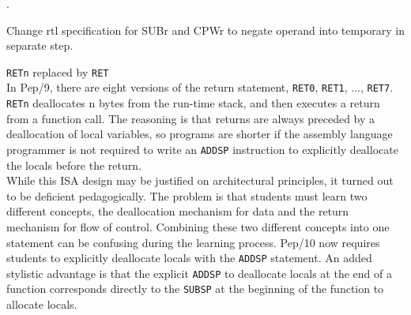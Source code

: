 \documentclass[10pt,fleqn]{book}
\newenvironment{exercises}
   {\begin{list}
      {\arabic{ecounter}.}
      {
         \usecounter{ecounter}
         \setcounter {ecounter}{0}
         \setlength\leftmargin{2pc}
         \setlength\labelwidth{6pc}
         \setlength\labelsep{1pc}
      }}
   {\end{list}}
\newcounter{ecounter}
\begin{document}
\begin{exercises}
\item Change rtl specification for SUBr and CPWr to negate operand into temporary in separate step.\\[6pt]
\item \verb|RETn| replaced by \verb|RET|\\[6pt]
In Pep/9, there are eight versions of the return statement, \verb|RET0|, \verb|RET1|, ..., \verb|RET7|.
\verb|RETn| deallocates n bytes from the run-time stack, and then executes a return from a function call.
The reasoning is that returns are always preceded by a deallocation of local variables, so programs are shorter if the assembly language programmer is not required to write an \verb|ADDSP| instruction to explicitly deallocate the locals before the return.\\[6pt]
While this ISA design may be justified on architectural principles, it turned out to be deficient pedagogically.
The problem is that students must learn two different concepts, the deallocation mechanism for data and the return mechanism for flow of control.
Combining these two different concepts into one statement can be confusing during the learning process.
Pep/10 now requires students to explicitly deallocate locals with the \verb|ADDSP| statement.
An added stylistic advantage is that the explicit \verb|ADDSP| to deallocate locals at the end of a function corresponds directly to the \verb|SUBSP| at the beginning of the function to allocate locals.


\end{exercises}
\end{document}

